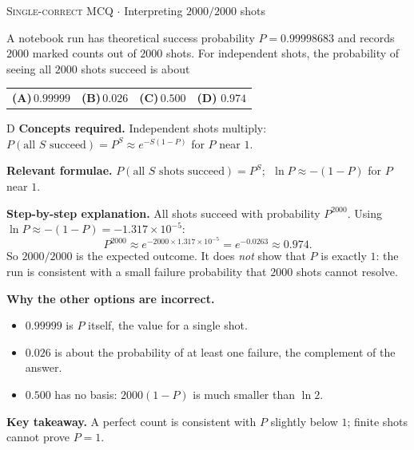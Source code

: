 \documentclass[11pt,a4paper]{article}
\newcommand{\optlabel}[1]{\textbf{(#1)}}
\newcommand{\correctlabel}[1]{\textcolor{okgreen}{\textbf{(#1)}\,\ding{51}}}
\newenvironment{qitem}[1]{\begin{list}{}{\setlength{\leftmargin}{3.3em}\setlength{\labelwidth}{3.1em}%
  \setlength{\labelsep}{0.2em}\setlength{\topsep}{3pt}\setlength{\parsep}{3pt}}\item[\textbf{Q.#1}\hfill]}{\end{list}}
\newcommand{\qsep}{\par\vspace{2pt}{\color{black!15}\hrule}\vspace{4pt}}
\newcommand{\qmeta}[2]{{\footnotesize\color{black!60}\textsc{#1} \;$\cdot$\; #2}\par}
\begin{document}
\begin{qitem}{73}
\qmeta{Single-correct MCQ}{Interpreting $2000/2000$ shots}
A notebook run has theoretical success probability $P = 0.99998683$ and records $2000$ marked counts out of $2000$ shots. For independent shots, the probability of seeing all $2000$ shots succeed is about
\par\smallskip\noindent\begin{tabularx}{\linewidth}{@{}*{4}{L}@{}}
\optlabel{A}\,$0.99999$ & \optlabel{B}\,$0.026$ & \optlabel{C}\,$0.500$ & \correctlabel{D}\,$0.974$
\end{tabularx}
\end{qitem}
\begin{solbox}{D}
\textbf{\color{brand}Concepts required.} Independent shots multiply: $P(\text{all } S \text{ succeed}) = P^S \approx e^{-S(1-P)}$ for $P$ near $1$.

\textbf{\color{brand}Relevant formulae.} $P(\text{all } S \text{ shots succeed}) = P^S$; $\;\ln P \approx -(1 - P)$ for $P$ near $1$.

\textbf{\color{brand}Step-by-step explanation.} All shots succeed with probability $P^{2000}$. Using $\ln P \approx -(1 - P) = -1.317\times10^{-5}$:
\[ P^{2000} \approx e^{-2000\times1.317\times10^{-5}} = e^{-0.0263} \approx 0.974. \]
So $2000/2000$ is the expected outcome. It does \emph{not} show that $P$ is exactly $1$: the run is consistent with a small failure probability that $2000$ shots cannot resolve.

\textbf{\color{brand}Why the other options are incorrect.}
\begin{itemize}[leftmargin=2.4em, itemsep=1pt, topsep=2pt]
\item[\textbf{(A)}] $0.99999$ is $P$ itself, the value for a single shot.
\item[\textbf{(B)}] $0.026$ is about the probability of at least one failure, the complement of the answer.
\item[\textbf{(C)}] $0.500$ has no basis: $2000(1 - P)$ is much smaller than $\ln 2$.
\end{itemize}
\textbf{\color{brand}Key takeaway.} A perfect count is consistent with $P$ slightly below $1$; finite shots cannot prove $P = 1$.
\end{solbox}
\qsep
\end{document}
